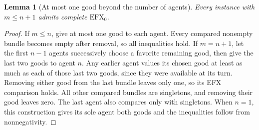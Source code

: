 \documentclass[11pt,a4paper]{article}
\newtheorem{lemma}[theorem]{Lemma}
\theoremstyle{definition}
\theoremstyle{remark}
\begin{document}
\begin{lemma}[At most one good beyond the number of agents]
Every instance with $m\leq n+1$ admits complete $\mathrm{EFX}_0$.
\end{lemma}
\begin{proof}
If $m\leq n$, give at most one good to each agent. Every compared nonempty bundle becomes empty after removal, so all inequalities hold. If $m=n+1$, let the first $n-1$ agents successively choose a favorite remaining good, then give the last two goods to agent $n$. Any earlier agent values its chosen good at least as much as each of those last two goods, since they were available at its turn. Removing either good from the last bundle leaves only one, so its EFX comparison holds. All other compared bundles are singletons, and removing their good leaves zero. The last agent also compares only with singletons. When $n=1$, this construction gives its sole agent both goods and the inequalities follow from nonnegativity.
\end{proof}
\end{document}
